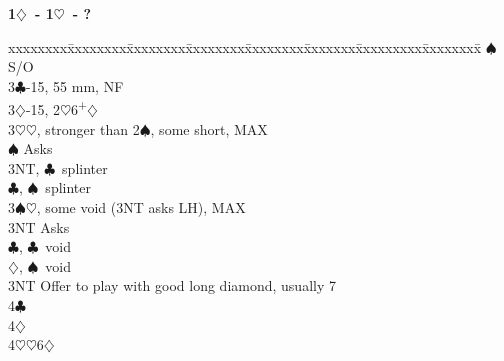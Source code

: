 \documentclass[10pt]{article}
\renewcommand{\c}{$\clubsuit$}
\renewcommand{\d}{$\diamondsuit$}
\newcommand{\h}{$\heartsuit$}
\newcommand{\s}{$\spadesuit$}
\newcommand{\p}{\textsuperscript{+}}
\newcommand{\m}{\textsuperscript{\textminus}}
\newenvironment{bidtable}[1][]
{\textbf{#1}
  \begin{adjustwidth}{1em}{}
    \addvspace{2pt}
    \begin{tabbing}
      xxxxxxxx\=xxxxxxxx\=xxxxxxxx\=xxxxxxxx\=xxxxxxxx\=xxxxxxx\=xxxxxxxxx\=xxxxxxxx\=\kill}
{\end{tabbing}\end{adjustwidth}\bigskip}%
\begin{document}
\begin{bidtable}[1\d\ - 1\h\ - ?]
     \s  \> S/O                                 \\
3\c  {}-15, 55 mm, NF                                        \\
3\d  {}-15, 2\m\h 6\p\d                                      \\
3\h  {}\h, stronger than 2\s, some short, MAX                 \\
     \s  \> Asks                                            \\
     \>      \> 3NT, \c\ splinter                               \\
     \>      \c, \s\ splinter                               \\
3\s  {}\h, some void (3NT asks LH), MAX                       \\
     \> 3NT  \> Asks                                            \\
     \>      \c, \c\ void                                   \\
     \>      \d, \s\ void                                   \\
3NT  \> Offer to play with good long diamond, usually 7         \\
4\c  {}                                                    \\
4\d  {}                                                    \\
4\h  {}\h 6\d
\end{bidtable}
\end{document}
